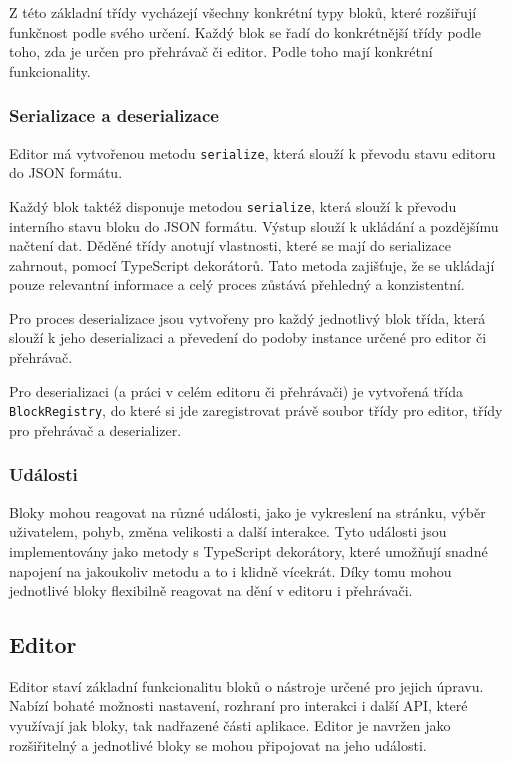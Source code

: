 Z této základní třídy vycházejí všechny konkrétní typy bloků, které rozšiřují funkčnost podle svého určení.
Každý blok se řadí do konkrétnější třídy podle toho, zda je určen pro přehrávač či editor.
Podle toho mají konkrétní funkcionality.

\subsubsection{Serializace a deserializace}

Editor má vytvořenou metodu \texttt{serialize}, která slouží k převodu stavu editoru do JSON formátu.

Každý blok taktéž disponuje metodou \texttt{serialize}, která slouží k převodu interního stavu bloku do JSON formátu. 
Výstup slouží k ukládání a pozdějšímu načtení dat. 
Děděné třídy anotují vlastnosti, které se mají do serializace zahrnout, pomocí TypeScript dekorátorů. 
Tato metoda zajišťuje, že se ukládají pouze relevantní informace a celý proces zůstává přehledný a konzistentní.

Pro proces deserializace jsou vytvořeny pro každý jednotlivý blok třída, která slouží k jeho deserializaci a převedení do podoby instance určené pro editor či přehrávač.

Pro deserializaci (a práci v celém editoru či přehrávači) je vytvořená třída \texttt{BlockRegistry}, do které si jde zaregistrovat právě soubor třídy pro editor, třídy pro přehrávač a deserializer. 

\subsubsection{Události}

Bloky mohou reagovat na různé události, jako je vykreslení na stránku, výběr uživatelem, pohyb, změna velikosti a další interakce.
Tyto události jsou implementovány jako metody s TypeScript dekorátory, které umožňují snadné napojení na jakoukoliv metodu a to i klidně vícekrát.
Díky tomu mohou jednotlivé bloky flexibilně reagovat na dění v editoru i přehrávači.

\subsection{Editor}

Editor staví základní funkcionalitu bloků o nástroje určené pro jejich úpravu. 
Nabízí bohaté možnosti nastavení, rozhraní pro interakci i další API, které využívají jak bloky, tak nadřazené části aplikace.
Editor je navržen jako rozšiřitelný a jednotlivé bloky se mohou připojovat na jeho události.

